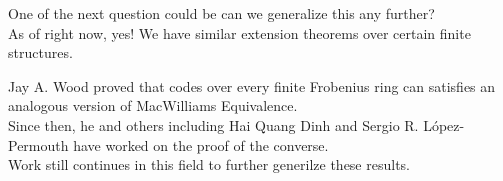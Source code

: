 \documentclass{beamer}
\begin{document}
\begin{frame}
    
    One of the next question could be can we generalize this any further?\\
    As of right now, yes! We have similar extension theorems over certain finite structures.

\end{frame}

\begin{frame}
    
    Jay A. Wood proved that codes over every finite Frobenius ring can satisfies an analogous version of
    MacWilliams Equivalence.\\
    Since then, he and others including Hai Quang Dinh and Sergio R. L\'{o}pez-Permouth have worked on
    the proof of the converse.\\
    Work still continues in this field to further generilze these results.

\end{frame}
\end{document}
